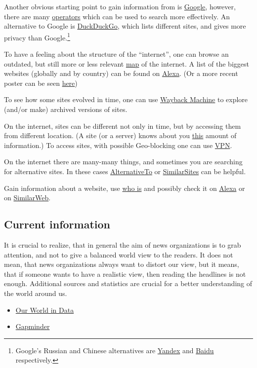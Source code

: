 \documentclass{article}
\begin{document}
Another obvious starting point to gain information from is \href{https://www.google.com/}{Google}, however, there are many \href{https://ahrefs.com/blog/google-advanced-search-operators/}{operators} which can be used to search more effectively.
An alternative to Google is \href{https://duckduckgo.com/}{DuckDuckGo}, which lists different sites, and gives more privacy than Google.\footnote{Google's Russian and Chinese alternatives are \href{https://yandex.com/}{Yandex} and \href{https://www.baidu.com/}{Baidu} respectively.}

To have a feeling about the structure of the ``internet'', one can browse an outdated, but still more or less relevant \href{https://internet-map.net/}{map} of the internet. A list of the biggest websites (globally and by country) can be found on \href{https://www.alexa.com/topsites}{Alexa}. (Or a more recent poster can be seen \href{https://www.visualcapitalist.com/wp-content/uploads/2019/08/top-100-websites-ranking.html}{here})

To see how some sites evolved in time, one can use \href{https://archive.org/web/}{Wayback Machine} to explore (and/or make) archived versions of sites. 

On the internet, sites can be different not only in time, but by accessing them from different location. (A site (or a server) knows about you \href{https://whatismyipaddress.com/}{this} amount of information.) To access sites, with possible Geo-blocking one can use \href{https://www.howtogeek.com/133680/htg-explains-what-is-a-vpn/}{VPN}.

On the internet there are many-many things, and sometimes you are searching for alternative sites. In these cases \href{https://alternativeto.net/}{AlternativeTo} or \href{https://www.similarsites.com/}{SimilarSites} can be helpful.

Gain information about a website, use \href{http://whois.domaintools.com/}{who is} and possibly check it on \href{https://www.alexa.com/siteinfo/}{Alexa} or on \href{https://www.similarweb.com/}{SimilarWeb}.

\subsection{Current information}

It is crucial to realize, that in general the aim of news organizations is to grab attention, and not to give a balanced world view to the readers.
It does not mean, that news organizations always want to distort our view, but it means, that if someone wants to have a realistic view, then reading the headlines is not enough. Additional sources and statistics are crucial for a better understanding of the world around us.
\begin{itemize}
    \item \href{https://ourworldindata.org/}{Our World in Data}
    \item \href{https://www.gapminder.org/}{Gapminder}
\end{itemize}
\end{document}
